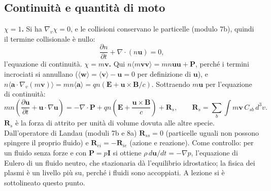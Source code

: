 \subsection{Continuità e quantità di moto}
\textbf{$\chi=1$.} Si ha $\nabla_v\chi=0$, e le collisioni conservano le particelle (modulo 7b), quindi il termine collisionale è nullo:
\begin{equation}
\frac{\partial n}{\partial t}+\nabla\cdot(n\mathbf{u})=0,
\end{equation}
l'equazione di continuità. \textbf{$\chi=m\mathbf{v}$.} Qui $n\langle m\mathbf{v}\mathbf{v}\rangle=mn\mathbf{u}\mathbf{u}+\mathbf{P}$, perché i termini incrociati si annullano ($\langle\mathbf{w}\rangle=\langle\mathbf{v}\rangle-\mathbf{u}=0$ per definizione di $\mathbf{u}$), e $n\langle\mathbf{a}\cdot\nabla_v(m\mathbf{v})\rangle=mn\langle\mathbf{a}\rangle=qn(\mathbf{E}+\mathbf{u}\times\mathbf{B}/c)$. Sottraendo $m\mathbf{u}$ per l'equazione di continuità:
\begin{equation}
mn\left(\frac{\partial\mathbf{u}}{\partial t}+\mathbf{u}\cdot\nabla\mathbf{u}\right)=-\nabla\cdot\mathbf{P}+qn\left(\mathbf{E}+\frac{\mathbf{u}\times\mathbf{B}}{c}\right)+\mathbf{R}_s,\qquad\mathbf{R}_s=\sum_b\int m\mathbf{v}\,C_{sb}\,d^3v .
\end{equation}
$\mathbf{R}_s$ è la forza di attrito per unità di volume dovuta alle altre specie. Dall'operatore di Landau (moduli 7b e 8a) $\mathbf{R}_{ss}=0$ (particelle uguali non possono spingere il proprio fluido) e $\mathbf{R}_{ei}=-\mathbf{R}_{ie}$ (azione e reazione).
Come controllo: per un fluido senza forze e con $\mathbf{P}=p\mathbf{I}$ si ottiene $\rho\,d\mathbf{u}/dt=-\nabla p$, l'equazione di Eulero di un fluido neutro, che stazionaria dà l'equilibrio idrostatico; la fisica dei plasmi è un livello più su, perché i fluidi sono accoppiati. A lezione si è sottolineato questo punto.

